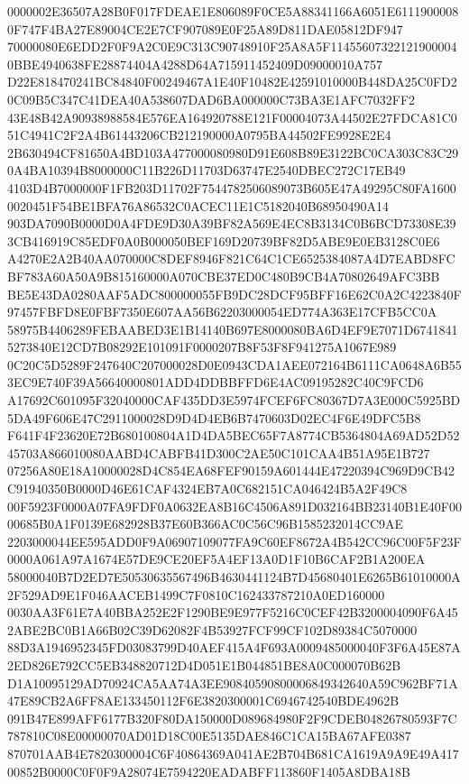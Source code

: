\documentclass[UTF8,fontset=fandol,zihao=-4,a4paper]{ctexart}
\begin{document}
{{0000002E36507A28B0F017FDEAE1E806089F0CE5A88341166A6051E61119000080F747F4BA27E89004CE2E7CF907089E0F25A89D811DAE05812DF947
70000080E6EDD2F0F9A2C0E9C313C90748910F25A8A5F114556073221219000040BBE4940638FE28874404A4288D64A715911452409D09000010A757
D22E818470241BC84840F00249467A1E40F10482E42591010000B448DA25C0FD20C09B5C347C41DEA40A538607DAD6BA000000C73BA3E1AFC7032FF2
43E48B42A90938988584E576EA164920788E121F00004073A44502E27FDCA81C051C4941C2F2A4B61443206CB212190000A0795BA44502FE9928E2E4
2B630494CF81650A4BD103A477000080980D91E608B89E3122BC0CA303C83C290A4BA10394B8000000C11B226D11703D63747E2540DBEC272C17EB49
4103D4B7000000F1FB203D11702F7544782506089073B605E47A49295C80FA16000020451F54BE1BFA76A86532C0ACEC11E1C5182040B68950490A14
903DA7090B0000D0A4FDE9D30A39BF82A569E4EC8B3134C0B6BCD73308E393CB416919C85EDF0A0B000050BEF169D20739BF82D5ABE9E0EB3128C0E6
A4270E2A2B40AA070000C8DEF8946F821C64C1CE6525384087A4D7EABD8FCBF783A60A50A9B815160000A070CBE37ED0C480B9CB4A70802649AFC3BB
BE5E43DA0280AAF5ADC800000055FB9DC28DCF95BFF16E62C0A2C4223840F97457FBFD8E0FBF7350E607AA56B62203000054ED774A363E17CFB5CC0A
58975B4406289FEBAABED3E1B14140B697E8000080BA6D4EF9E7071D67418415273840E12CD7B08292E101091F0000207B8F53F8F941275A1067E989
0C20C5D5289F247640C207000028D0E0943CDA1AEE072164B6111CA0648A6B553EC9E740F39A56640000801ADD4DDBBFFD6E4AC09195282C40C9FCD6
A17692C601095F32040000CAF435DD3E5974FCEF6FC80367D7A3E000C5925BD5DA49F606E47C2911000028D9D4D4EB6B7470603D02EC4F6E49DFC5B8
F641F4F23620E72B680100804A1D4DA5BEC65F7A8774CB5364804A69AD52D5245703A866010080AABD4CABFB41D300C2AE50C101CAA4B51A95E1B727
07256A80E18A10000028D4C854EA68FEF90159A601444E47220394C969D9CB42C91940350B0000D46E61CAF4324EB7A0C682151CA046424B5A2F49C8
00F5923F0000A07FA9FDF0A0632EA8B16C4506A891D032164BB23140B1E40F0000685B0A1F0139E682928B37E60B366AC0C56C96B1585232014CC9AE
2203000044EE595ADD0F9A06907109077FA9C60EF8672A4B542CC96C00F5F23F0000A061A97A1674E57DE9CE20EF5A4EF13A0D1F10B6CAF2B1A200EA
58000040B7D2ED7E50530635567496B4630441124B7D45680401E6265B61010000A2F529AD9E1F046AACEB1499C7F0810C162433787210A0ED160000
0030AA3F61E7A40BBA252E2F1290BE9E977F5216C0CEF42B3200004090F6A452ABE2BC0B1A66B02C39D62082F4B53927FCF99CF102D89384C5070000
88D3A1946952345FD03083799D40AEF415A4F693A0009485000040F3F6A45E87A2ED826E792CC5EB348820712D4D051E1B044851BE8A0C000070B62B
D1A10095129AD70924CA5AA74A3EE90840590800006849342640A59C962BF71A47E89CB2A6FF8AE133450112F6E3820300001C6946742540BDE4962B
091B47E899AFF6177B320F80DA150000D089684980F2F9CDEB04826780593F7C787810C08E00000070AD01D18C00E5135DAE846C1CA15BA67AFE0387
870701AAB4E7820300004C6F40864369A041AE2B704B681CA1619A9A9E49A41700852B0000C0F0F9A28074E7594220EADABFF113860F1405A8DBA18B
}}
\end{document}
